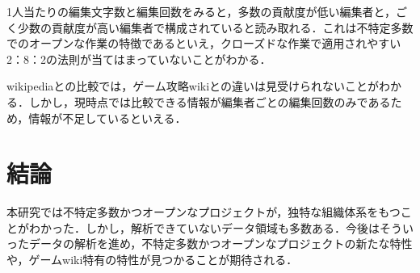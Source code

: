 \documentclass[uplatex,twocolumn,dvipdfmx]{jsarticle}
\begin{document}
1人当たりの編集文字数と編集回数をみると，多数の貢献度が低い編集者と，ごく少数の貢献度が高い編集者で構成されていると読み取れる．これは不特定多数でのオープンな作業の特徴であるといえ，クローズドな作業で適用されやすい2：8：2の法則が当てはまっていないことがわかる．

wikipediaとの比較では，ゲーム攻略wikiとの違いは見受けられないことがわかる．しかし，現時点では比較できる情報が編集者ごとの編集回数のみであるため，情報が不足しているといえる．

\section{結論}

本研究では不特定多数かつオープンなプロジェクトが，独特な組織体系をもつことがわかった．しかし，解析できていないデータ領域も多数ある．今後はそういったデータの解析を進め，不特定多数かつオープンなプロジェクトの新たな特性や，ゲームwiki特有の特性が見つかることが期待される．


\end{document}
